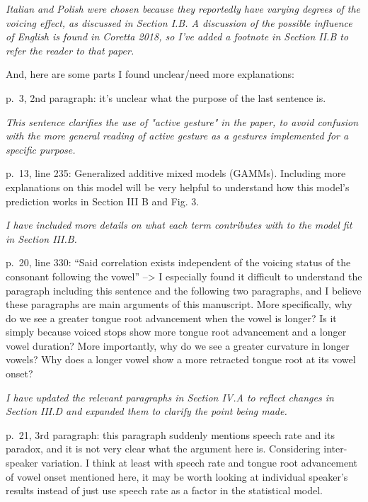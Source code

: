 \documentclass[]{article}
\begin{document}
\begin{adjustwidth}{1cm}{} \textit{
Italian and Polish were chosen because they reportedly have varying degrees of the voicing effect, as discussed in Section I.B.
A discussion of the possible influence of English is found in Coretta 2018, so I've added a footnote in Section II.B to refer the reader to that paper.
} \end{adjustwidth}

And, here are some parts I found unclear/need more explanations:

p.~3, 2nd paragraph: it's unclear what the purpose of the last sentence
is.

\begin{adjustwidth}{1cm}{} \textit{
This sentence clarifies the use of "active gesture" in the paper, to avoid confusion with the more general reading of active gesture as a gestures implemented for a specific purpose.
} \end{adjustwidth}

p.~13, line 235: Generalized additive mixed models (GAMMs). Including
more explanations on this model will be very helpful to understand how
this model's prediction works in Section III B and Fig. 3.

\begin{adjustwidth}{1cm}{} \textit{
I have included more details on what each term contributes with to the model fit in Section III.B.
} \end{adjustwidth}

p.~20, line 330: ``Said correlation exists independent of the voicing
status of the consonant following the vowel'' --\textgreater{} I
especially found it difficult to understand the paragraph including this
sentence and the following two paragraphs, and I believe these
paragraphs are main arguments of this manuscript. More specifically, why
do we see a greater tongue root advancement when the vowel is longer? Is
it simply because voiced stops show more tongue root advancement and a
longer vowel duration? More importantly, why do we see a greater
curvature in longer vowels? Why does a longer vowel show a more
retracted tongue root at its vowel onset?

\begin{adjustwidth}{1cm}{} \textit{
I have updated the relevant paragraphs in Section IV.A to reflect changes in Section III.D and expanded them to clarify the point being made.
} \end{adjustwidth}

p.~21, 3rd paragraph: this paragraph suddenly mentions speech rate and
its paradox, and it is not very clear what the argument here is.
Considering inter-speaker variation. I think at least with speech rate
and tongue root advancement of vowel onset mentioned here, it may be
worth looking at individual speaker's results instead of just use speech
rate as a factor in the statistical model.
\end{document}
